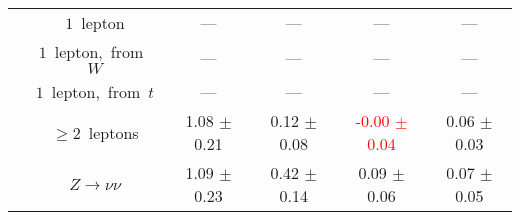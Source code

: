 \documentclass{article}
\begin{document}
\begin{longtable}{|l|c|c|c|c|c|}
 & $1$~lepton  & ---  & ---  & ---  & --- \\* 
 & $1$~lepton,~from~$W$  & ---  & ---  & ---  & --- \\* 
 & $1$~lepton,~from~$t$  & ---  & ---  & ---  & --- \\* 
 & $\ge2$~leptons  & 1.08 $\pm$ 0.21  & 0.12 $\pm$ 0.08  & \textcolor{red}{ -0.00 $\pm$ 0.04 }  & 0.06 $\pm$ 0.03 \\* 
 & $Z\rightarrow\nu\nu$  & 1.09 $\pm$ 0.23  & 0.42 $\pm$ 0.14  & 0.09 $\pm$ 0.06  & 0.07 $\pm$ 0.05 \\* 
\hline 
\end{longtable} 

 
 
 
 
\pagebreak 

 
 
 
 
\end{document}
